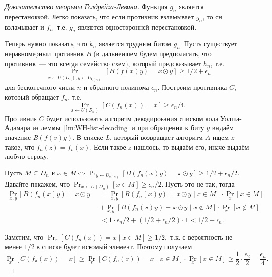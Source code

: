 \documentclass[12pt,a4paper]{article}
\theoremstyle{definition}
\theoremstyle{plain}
\theoremstyle{remark}
\begin{document}
\begin{proof}[Доказательство теоремы Голдрейха-Левина]
Функция $g_n$ является перестановкой. Легко показать, что если противник взламывает
$g_n$, то он взламывает и $f_n$, т.е. $g_n$ является односторонней перестановкой.

Теперь нужно показать, что $h_n$ является трудным битом $g_n$. 
Пусть существует неравномерный противник $B$ (в дальнейшем будем предполагать, 
что противник~--- это всегда семейство схем), который предсказывает $h_n$, т.е. 
$$\Pr_{\substack{x\gets U(D_n), y\gets U_{k(n)}}} [B(f(x)y) = x\odot y] \ge 1/2 + \epsilon_n$$
для бесконечного числа $n$ и обратного полинома $\epsilon_n$. Построим противника $C$,
который обращает $f_n$, т.е.
$$\Pr_{x\gets U(D_n)}[C(f_n(x)) = x]\ge \epsilon_n/4.$$
Противник $C$ будет использовать алгоритм декодирования списком кода Уолша-Адамара из леммы~\ref{lm:WH-list-decoding}
и при обращении к биту $y$ выдаём значение $B(f(x)y)$.
В списке $L$, который возвращает алгоритм $A$ ищем $z$ такое, что $f_n(z) = f_n(x)$. Если такое $z$ нашлось, то выдаём его, 
иначе выдаём любую строку.

Пусть $M\subseteq D_n$ и $x\in M\iff \Pr_{y\gets U_{k(n)}}[B(f_n(x)y) = x\odot y]\ge 1/2 + \epsilon_n/2.$
Давайте покажем, что $\Pr_{x\gets U(D_n)} [x\in M]\ge \epsilon_n/2$. Пусть это не так, тогда
$$
\begin{aligned}
\Pr_{x,y}[B(f_n(x)y) = x\odot y] &= 
    \Pr_{x,y}[B(f_n(x)y) = x\odot y \mid x    \in M] \cdot \Pr_x[x    \in M]\\ 
&+  \Pr_{x,y}[B(f_n(x)y) = x\odot y \mid x\not\in M] \cdot \Pr_x[x\not\in M]\\
&< 1 \cdot \epsilon_n/2 + (1/2 + \epsilon_n/2) \cdot 1 < 1/2 + \epsilon_n.
\end{aligned}
$$

Заметим, что $\Pr_{x}[C(f_n(x)) = x\mid x\in M]\ge 1/2,$ т.к. с вероятность не менее $1/2$ в списке будет искомый элемент.
Поэтому получаем
$$
\Pr_{x} [C(f_n(x)) = x]\ge \Pr_{x} [C(f_n(x)) = x\mid x\in M]\cdot \Pr_x[x    \in M]
\ge \frac12 \cdot \frac{\epsilon_2}{2} = \frac{\epsilon_n}{4}.
$$
\end{proof}
\end{document}

